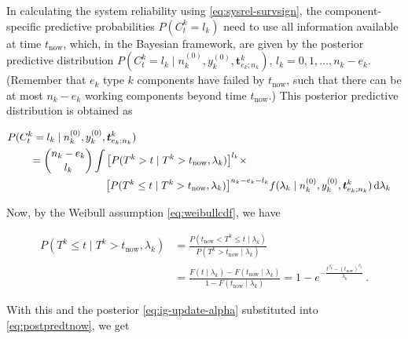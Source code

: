 \documentclass[Journal,SectionNumbers,SingleSpace,InsideFigs]{ascelike}
\newcommand{\dd}{\,\mathrm{d}}
\renewcommand{\vec}[1]{{\bm#1}}
\newcommand{\uz}{^{(0)}} %
\def\ykz{y\uz_k}
\def\nkz{n\uz_k}
\def\tnow{t_\text{now}}
\begin{document}
In calculating the system reliability using \eqref{eq:sysrel-survsign},
the component-specific predictive probabilities $P(C^k_t = l_k)$
need to use all information available at time $\tnow$,
which, in the Bayesian framework,
are given by the posterior predictive distribution 
$P(C^k_t = l_k\mid\nkz,\ykz, \vec{t}^k_{e_k;n_k})$, $l_k = 0, 1, \ldots, n_k-e_k$. %
(Remember that $e_k$ type $k$ components have failed by $\tnow$,
such that there can be at most $n_k-e_k$ working components beyond time $\tnow$.)
This posterior predictive distribution is obtained as
\begin{linenomath*}
\begin{align}
\lefteqn{%
P(C^k_t = l_k\mid\nkz,\ykz, \vec{t}^k_{e_k;n_k})}\hspace*{5ex} \nonumber\\  %
 &= { n_k - e_k \choose l_k} \int \big[P(T^k >    t \mid T^k > \tnow, \lambda_k)\big]^{l_k} \times \nonumber\\ & \hspace*{17ex}
                                  \big[P(T^k \leq t \mid T^k > \tnow, \lambda_k)\big]^{n_k - e_k - l_k}
    f(\lambda_k\mid\nkz,\ykz,\vec{t}^k_{e_k;n_k}) \dd \lambda_k
\label{eq:postpredtnow}
\end{align}
\end{linenomath*}
%
Now, by the Weibull assumption \eqref{eq:weibullcdf}, we have
\begin{linenomath*}
\begin{align}
P(T^k \leq t \mid T^k > \tnow, \lambda_k)
 &= \frac{P(\tnow < T^k \leq t \mid\lambda_k)}{P(T^k > \tnow \mid \lambda_k)} \nonumber\\
 &= \frac{F(t\mid\lambda_k) - F(\tnow\mid\lambda_k)}{1-F(\tnow\mid\lambda_k)} 
  = 1 - e^{-\frac{t^{\beta_k} - (\tnow)^{\beta_k}}{\lambda_k}}\,.
\end{align}
\end{linenomath*}
%
With this and the posterior \eqref{eq:ig-update-alpha} substituted into \eqref{eq:postpredtnow}, we get
\end{document}
